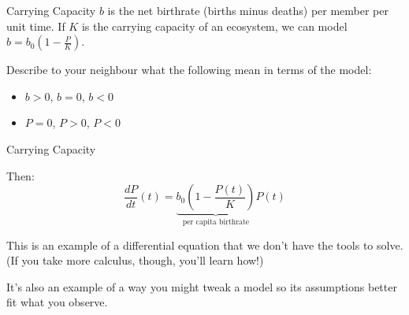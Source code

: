 \begin{frame}[t]{Carrying Capacity}\AnswerSpace
$b$  is the net birthrate (births minus deaths) per member per unit time. 
If $K$ is the carrying capacity of an ecosystem, we can model $b=b_0(1-\frac{P}{K})$. 

\pause

\NowYou Describe to your neighbour what the following mean in terms of the model:
\begin{itemize}
\item $b>0$, $b=0$, $b<0$
\item $P=0$, $P>0$, $P<0$
\end{itemize}
\end{frame}

\begin{frame}[t]{Carrying Capacity}

Then:
\[\frac{dP}{dt}(t) =\underbrace{ b_0\left(1-\frac{P(t)}{K}\right)}_{\text{per capita birthrate}}P(t)\]
\pause

This is an example of a differential equation that we don't have the tools to solve. (If you take more calculus, though, you'll learn how!)

It's also an example of a way you might tweak a model so its assumptions better fit what you observe.
\end{frame}

